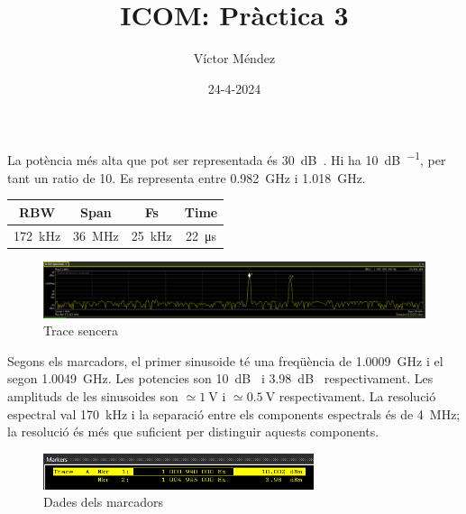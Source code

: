 \documentclass[catalan, a4paper, nobib]{tufte-handout}
\author{Víctor Méndez}
\title{ICOM: Pràctica 3}
\date{24-4-2024}
\begin{document}
\maketitle


La potència més alta que pot ser representada és \qty[qualifier-mode=combine]{30}{\deci\bel{}}. Hi ha \qty{10}{\deci\bel\per{}}, per tant un ratio de \num{10}. Es representa entre \qty{0.982}{\giga\hertz} i \qty{1.018}{\giga\hertz}.

\begin{table}[h]
  \begin{center}
    \begin{tabular}{@{}cccc@{}}
      \toprule
      RBW & Span & Fs & Time \\
      \midrule
      \qty{172}{\kilo\hertz} & \qty{36}{\mega\hertz} & \qty{25}{\kilo\hertz} & \qty{22}{\micro\second} \\
      \bottomrule
    \end{tabular}
  \end{center}
\end{table}


\begin{figure}[!h]
  \begin{center}
    \includegraphics[width=465px]{q2_1.png}
  \end{center}
  \caption{Trace sencera}
\end{figure}

Segons els marcadors, el primer sinusoide té una freqüència de \qty{1.0009}{\giga\hertz} i el segon \qty{1.0049}{\giga\hertz}. Les potencies son \qty[qualifier-mode=combine]{10}{\deci\bel{}} i \qty[qualifier-mode=combine]{3.98}{\deci\bel{}} respectivament. Les amplituds de les sinusoides son $\simeq\qty{1}{\volt}$ i $\simeq\qty{0.5}{\volt}$ respectivament. La resolució espectral val \qty{170}{\kilo\hertz} i la separació entre els components espectrals és de \qty{4}{\mega\hertz}; la resolució és més que suficient per distinguir aquests components.

\begin{figure}[!h]
  \begin{center}
    \includegraphics[width=300px]{q2_2.png}
  \end{center}
  \caption{Dades dels marcadors}
\end{figure}
\end{document}
